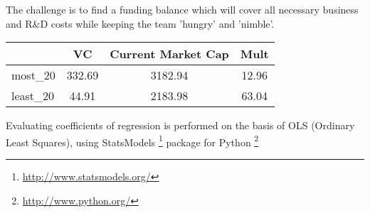The challenge is to find a funding balance which will cover all necessary business and R\&D costs while keeping the team 'hungry' and 'nimble'.

\begin{table}
    \centering
    \begin{tabular}{lccc}
    \toprule
    {} &      VC &  Current Market Cap &   Mult \\
    \midrule
    most\_20  &  332.69 &             3182.94 &  12.96 \\
    least\_20 &   44.91 &             2183.98 &  63.04 \\
    \bottomrule
    \end{tabular}
\end{table}

Evaluating coefficients of regression is performed on the basis of OLS (Ordinary Least Squares), using StatsModels \footnote{\url{http://www.statsmodels.org/}} package for Python \footnote{\url{http://www.python.org/}}

\vspace{0.1cm}

